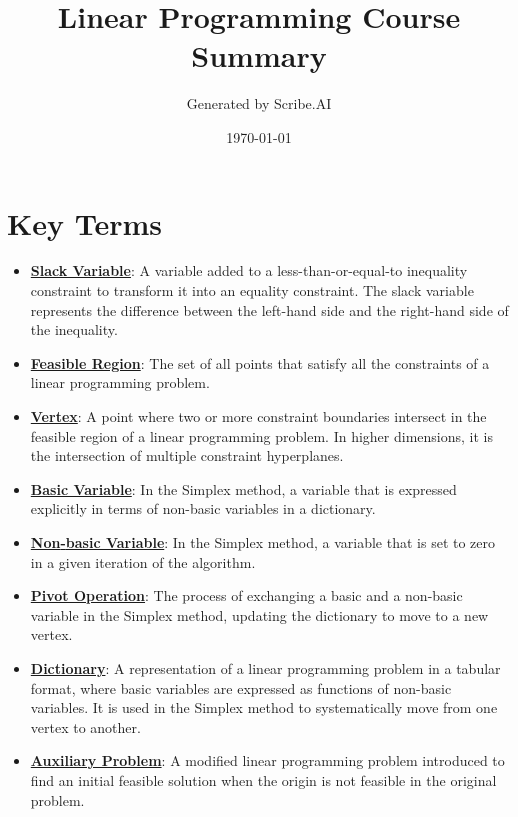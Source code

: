 \documentclass{article}%
\title{Linear Programming Course Summary}%
\author{Generated by Scribe.AI}%
\date{\today}%
\begin{document}
%
\normalsize%
\maketitle%
\section{Key Terms}%
\label{sec:KeyTerms}%
\begin{itemize}[leftmargin=*]%
\item \href{https://www.math.purdue.edu/~yipn/421//2024-08-27-ExSimplex.pdf#page=1}{\textbf{Slack Variable}}: A variable added to a less-than-or-equal-to inequality constraint to transform it into an equality constraint.  The slack variable represents the difference between the left-hand side and the right-hand side of the inequality.%
\item \href{https://www.math.purdue.edu/~yipn/421//2024-08-27-ExSimplex.pdf#page=4}{\textbf{Feasible Region}}: The set of all points that satisfy all the constraints of a linear programming problem.%
\item \href{https://www.math.purdue.edu/~yipn/421//2024-08-27-ExSimplex.pdf#page=5}{\textbf{Vertex}}: A point where two or more constraint boundaries intersect in the feasible region of a linear programming problem.  In higher dimensions, it is the intersection of multiple constraint hyperplanes.%
\item \href{https://www.math.purdue.edu/~yipn/421//2024-08-27-ExSimplex.pdf#page=6}{\textbf{Basic Variable}}: In the Simplex method, a variable that is expressed explicitly in terms of non-basic variables in a dictionary.%
\item \href{https://www.math.purdue.edu/~yipn/421//2024-08-27-ExSimplex.pdf#page=6}{\textbf{Non{-}basic Variable}}: In the Simplex method, a variable that is set to zero in a given iteration of the algorithm.%
\item \href{https://www.math.purdue.edu/~yipn/421//2024-08-27-ExSimplex.pdf#page=9}{\textbf{Pivot Operation}}: The process of exchanging a basic and a non-basic variable in the Simplex method, updating the dictionary to move to a new vertex.%
\item \href{https://www.math.purdue.edu/~yipn/421//2024-08-27-ExSimplex.pdf#page=26}{\textbf{Dictionary}}: A representation of a linear programming problem in a tabular format, where basic variables are expressed as functions of non-basic variables.  It is used in the Simplex method to systematically move from one vertex to another.%
\item \href{https://www.math.purdue.edu/~yipn/421//2024-08-27-ExSimplex.pdf#page=32}{\textbf{Auxiliary Problem}}: A modified linear programming problem introduced to find an initial feasible solution when the origin is not feasible in the original problem.%
\end{itemize}%
\end{document}
